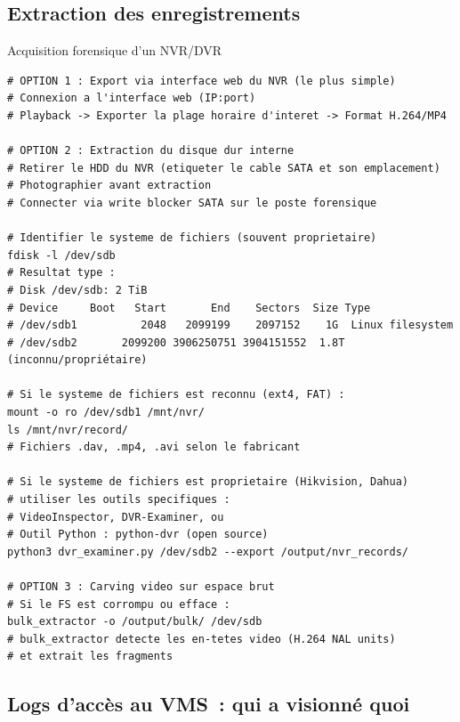 \subsection{Extraction des enregistrements}

\begin{boxoutils}{Acquisition forensique d'un NVR/DVR}
\begin{lstlisting}[language=bash_forensique]
# OPTION 1 : Export via interface web du NVR (le plus simple)
# Connexion a l'interface web (IP:port)
# Playback -> Exporter la plage horaire d'interet -> Format H.264/MP4

# OPTION 2 : Extraction du disque dur interne
# Retirer le HDD du NVR (etiqueter le cable SATA et son emplacement)
# Photographier avant extraction
# Connecter via write blocker SATA sur le poste forensique

# Identifier le systeme de fichiers (souvent proprietaire)
fdisk -l /dev/sdb
# Resultat type :
# Disk /dev/sdb: 2 TiB
# Device     Boot   Start       End    Sectors  Size Type
# /dev/sdb1          2048   2099199    2097152    1G  Linux filesystem
# /dev/sdb2       2099200 3906250751 3904151552  1.8T  (inconnu/propriétaire)

# Si le systeme de fichiers est reconnu (ext4, FAT) :
mount -o ro /dev/sdb1 /mnt/nvr/
ls /mnt/nvr/record/
# Fichiers .dav, .mp4, .avi selon le fabricant

# Si le systeme de fichiers est proprietaire (Hikvision, Dahua)
# utiliser les outils specifiques :
# VideoInspector, DVR-Examiner, ou
# Outil Python : python-dvr (open source)
python3 dvr_examiner.py /dev/sdb2 --export /output/nvr_records/

# OPTION 3 : Carving video sur espace brut
# Si le FS est corrompu ou efface :
bulk_extractor -o /output/bulk/ /dev/sdb
# bulk_extractor detecte les en-tetes video (H.264 NAL units)
# et extrait les fragments
\end{lstlisting}
\end{boxoutils}

\subsection{Logs d'accès au VMS~: qui a visionné quoi}

